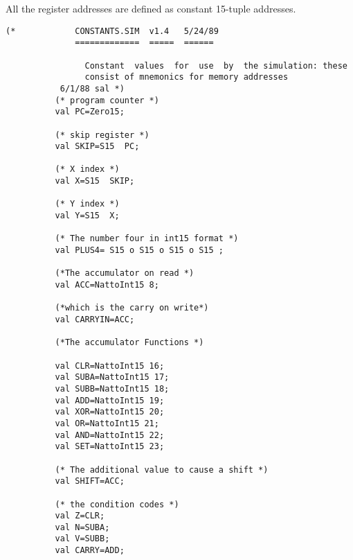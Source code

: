 All the register addresses are defined as constant 15-tuple addresses.
\begin{verbatim}
(*            CONSTANTS.SIM  v1.4	5/24/89
              =============  =====	======

                Constant  values  for  use  by  the simulation: these
                consist of mnemonics for memory addresses
           6/1/88 sal *)
          (* program counter *)
          val PC=Zero15;

          (* skip register *)
          val SKIP=S15  PC;

          (* X index *)
          val X=S15  SKIP;

          (* Y index *)
          val Y=S15  X;

          (* The number four in int15 format *)
          val PLUS4= S15 o S15 o S15 o S15 ;

          (*The accumulator on read *)
          val ACC=NattoInt15 8;

          (*which is the carry on write*)
          val CARRYIN=ACC;

          (*The accumulator Functions *)

          val CLR=NattoInt15 16;
          val SUBA=NattoInt15 17;
          val SUBB=NattoInt15 18;
          val ADD=NattoInt15 19;
          val XOR=NattoInt15 20;
          val OR=NattoInt15 21;
          val AND=NattoInt15 22;
          val SET=NattoInt15 23;

          (* The additional value to cause a shift *)
          val SHIFT=ACC;

          (* the condition codes *)
          val Z=CLR;
          val N=SUBA;
          val V=SUBB;
          val CARRY=ADD;
\end{verbatim}
